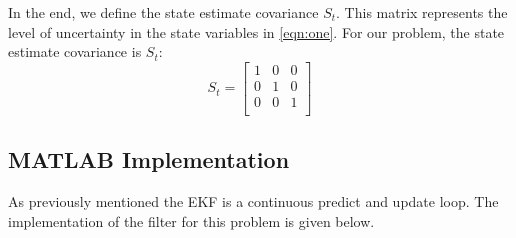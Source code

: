 \documentclass{article}
\begin{document}
In the end, we define the state estimate covariance $S_t$. This matrix represents the level of uncertainty in the state variables in \ref{eqn:one}. For our problem, the state estimate covariance is $S_t$:
\begin{equation}
S_t = \begin{bmatrix}
1 & 0 & 0 \\
0 & 1 & 0 \\
0 & 0 & 1 \\
\end{bmatrix}
\end{equation}

\subsection{MATLAB Implementation}

As previously mentioned the EKF is a continuous predict and update loop. The implementation of the filter for this problem is given below.  \\
\end{document}
